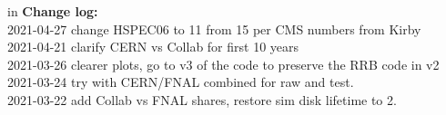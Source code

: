 \documentclass[12pt]{article}
\begin{document}
 in\pagebreak 
 {\bf Change log:}\\
2021-04-27 change HSPEC06 to 11 from 15 per CMS numbers from Kirby\\2021-04-21 clarify CERN vs Collab for first 10 years\\2021-03-26 clearer plots, go to v3 of the code to preserve the RRB code in v2\\2021-03-24 try with CERN/FNAL combined for raw and test.\\2021-03-22 add Collab vs FNAL shares, restore sim disk lifetime to 2.\\
\end{document}
